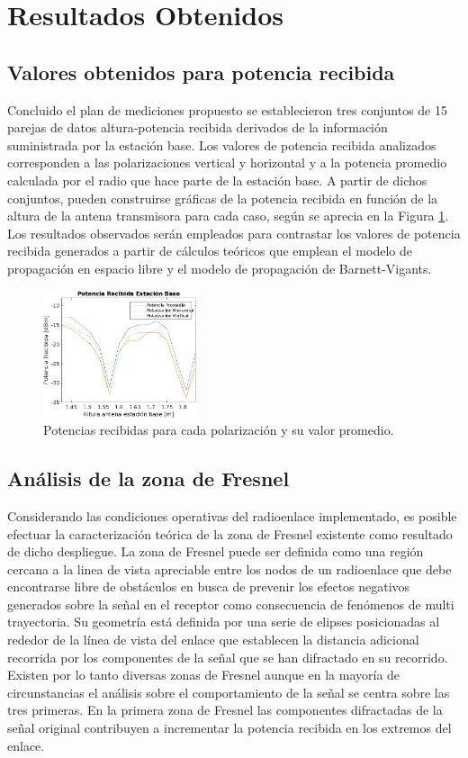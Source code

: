 \documentclass[conference]{IEEEtran}
\begin{document}
\section{Resultados Obtenidos}
\subsection{Valores obtenidos para potencia recibida}
Concluido el plan de mediciones propuesto se establecieron tres conjuntos de 15 parejas de datos altura-potencia recibida derivados de la información suministrada
por la estación base. Los valores de potencia recibida analizados corresponden a las polarizaciones vertical y horizontal y a la potencia
promedio calculada por el radio que hace parte de la estación base. A partir de dichos conjuntos, pueden construirse gráficas de la potencia recibida en función de la 
altura de la antena transmisora para cada caso, según se aprecia en la Figura \ref{fig:Potencias}. Los resultados observados serán empleados para contrastar los valores de potencia 
recibida generados a partir de cálculos teóricos que emplean el modelo de propagación en espacio libre y el modelo de propagación de Barnett-Vigants.
\begin{figure}
    \centering
          \includegraphics[width=0.4\textwidth]{Potencias.png}
        \caption{Potencias recibidas para cada polarización y su valor promedio.
        }
        \label{fig:Potencias}
\end{figure}
\subsection{Análisis de la zona de Fresnel}
Considerando las condiciones operativas del radioenlace implementado, es posible efectuar la caracterización teórica de la 
zona de Fresnel existente como resultado de dicho despliegue. La zona de Fresnel puede ser definida como una región cercana a la 
linea de vista apreciable entre los nodos de un radioenlace que debe encontrarse libre de obstáculos en busca de prevenir los efectos negativos
generados sobre la señal en el receptor como consecuencia de fenómenos de multi trayectoria. Su geometría está definida por una serie de elipses 
posicionadas al rededor de la línea de vista del enlace que establecen la distancia adicional recorrida por los componentes de la señal
que se han difractado en su recorrido. Existen por lo tanto diversas zonas de Fresnel aunque en la mayoría de circunstancias el análisis 
sobre el comportamiento de la señal se centra sobre las tres primeras.  En la primera zona de Fresnel las componentes difractadas de la señal
original contribuyen a incrementar la potencia recibida en los extremos del enlace. 
\end{document}
